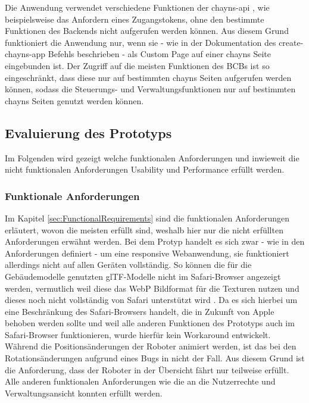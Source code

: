 Die Anwendung verwendet verschiedene Funktionen der chayns-api \cite{ChaynsApi}, wie beispielsweise das Anfordern eines Zugangstokens, ohne den bestimmte Funktionen des Backends nicht aufgerufen werden können.
Aus diesem Grund funktioniert die Anwendung nur, wenn sie - wie in der Dokumentation des create-chayns-app Befehls beschrieben \cite{CreateChaynsApp} - als Custom Page auf einer chayns Seite eingebunden ist. Der Zugriff auf die meisten Funktionen des \ac{BCB}s ist so eingeschränkt, dass diese nur auf bestimmten chayns Seiten aufgerufen werden können, sodass die Steuerungs- und Verwaltungsfunktionen nur auf bestimmten chayns Seiten genutzt werden können.

\subsection{Evaluierung des Prototyps}
Im Folgenden wird gezeigt welche funktionalen Anforderungen und inwieweit die nicht funktionalen Anforderungen Usability und Performance erfüllt werden.

\subsubsection{Funktionale Anforderungen}
Im Kapitel \ref{sec:FunctionalRequirements} sind die funktionalen Anforderungen erläutert, wovon die meisten erfüllt sind, weshalb hier nur die nicht erfüllten Anforderungen erwähnt werden. Bei dem Protyp handelt es sich zwar - wie in den Anforderungen definiert - um eine responsive Webanwendung, sie funktioniert allerdings nicht auf allen Geräten vollständig. So können die für die Gebäudemodelle genutzten \ac{glTF}-Modelle nicht im Safari-Browser angezeigt werden, vermutlich weil diese das \ac{WebP} Bildformat für die Texturen nutzen und dieses noch nicht vollständig von Safari unterstützt wird \cite{CanIUseWebP}. Da es sich hierbei um eine Beschränkung des Safari-Browsers handelt, die in Zukunft von Apple behoben werden sollte und weil alle anderen Funktionen des Prototyps auch im Safari-Browser funktionieren, wurde hierfür kein Workaround entwickelt. Während die Positionsänderungen der Roboter animiert werden, ist das bei den Rotationsänderungen aufgrund eines Bugs in \deckgl{} nicht der Fall. Aus diesem Grund ist die Anforderung, dass der Roboter in der Übersicht fährt nur teilweise erfüllt. Alle anderen funktionalen Anforderungen wie die an die Nutzerrechte und Verwaltungsansicht konnten erfüllt werden.

